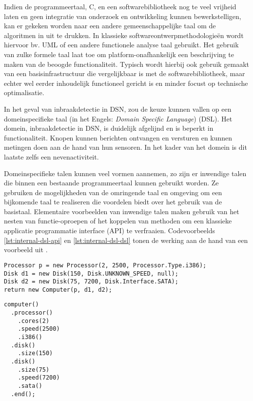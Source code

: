 Indien de programmeertaal, C, en een softwarebibliotheek nog te veel vrijheid
laten en geen integratie van onderzoek en ontwikkeling kunnen bewerkstelligen,
kan er gekeken worden naar een andere gemeenschappelijke taal om de algoritmen
in uit te drukken. In klassieke softwareontwerpmethodologie\"en wordt hiervoor
bv. UML \citep{url:uml} of een andere functionele analyse taal gebruikt. Het
gebruik van zulke formele taal laat toe om platform-onafhankelijk een
beschrijving te maken van de beoogde functionaliteit. Typisch wordt hierbij ook
gebruik gemaakt van een basisinfrastructuur die vergelijkbaar is met de
softwarebibliotheek, maar echter wel eerder inhoudelijk functioneel gericht is
en minder focust op technische optimalisatie.

In het geval van inbraakdetectie in DSN, zou de keuze kunnen vallen op een
domeinspecifieke taal (in het Engels: \emph{Domain Specific Language})
(DSL)\citep{van2000domain, mernik2005and, fowler2010domain}. Het domein,
inbraakdetectie in DSN, is duidelijk afgelijnd en is beperkt in
functionaliteit. Knopen kunnen berichten ontvangen en versturen en kunnen
metingen doen aan de hand van hun sensoren. In het kader van het domein is dit
laatste zelfs een nevenactiviteit.

Domeinspecifieke talen kunnen veel vormen aannemen, zo zijn er inwendige talen
die binnen een bestaande programmeertaal kunnen gebruikt worden. Ze gebruiken
de mogelijkheden van de omringende taal en omgeving om een bijkomende taal te
realiseren die voordelen biedt over het gebruik van de basistaal. Elementaire
voorbeelden van inwendige talen maken gebruik van het nesten van
functie-oproepen of het koppelen van methoden om een klassieke applicatie
programmatie interface (API) te verfraaien. Codevoorbeelds \ref{lst:internal-dsl-api}
en \ref{lst:internal-dsl-dsl} tonen de werking aan de hand van een voorbeeld
uit \citep{fowler2010domain}.

\begin{verbatim}
Processor p = new Processor(2, 2500, Processor.Type.i386);
Disk d1 = new Disk(150, Disk.UNKNOWN_SPEED, null);
Disk d2 = new Disk(75, 7200, Disk.Interface.SATA);
return new Computer(p, d1, d2);
\end{verbatim}
\label{lst:internal-dsl-api}

\begin{verbatim}
computer()
  .processor()
    .cores(2)
    .speed(2500)
    .i386()
  .disk()
    .size(150)
  .disk()
    .size(75)
    .speed(7200)
    .sata()
  .end();
\end{verbatim}
\label{lst:internal-dsl-dsl}

